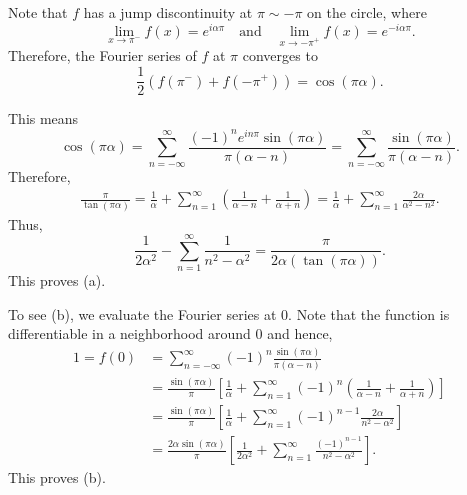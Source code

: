 \documentclass[12pt]{amsart}
\begin{document}
Note that $f$ has a jump discontinuity at $\pi\sim -\pi$ on the circle, where 
\begin{equation*}
	\lim_{x\to\pi^-}f(x) = e^{i\alpha\pi}\quad\text{and}\quad\lim_{x\to-\pi^+} f(x) = e^{-i\alpha\pi}.
\end{equation*}
Therefore, the Fourier series of $f$ at $\pi$ converges to 
\begin{equation*}
	\frac{1}{2}\left(f(\pi^-) + f(-\pi^+)\right) = \cos(\pi\alpha).
\end{equation*}

This means 
\begin{equation*}
	\cos(\pi\alpha) = \sum_{n = -\infty}^\infty\frac{(-1)^ne^{in\pi}\sin(\pi\alpha)}{\pi(\alpha - n)} = \sum_{n = -\infty}^\infty\frac{\sin(\pi\alpha)}{\pi(\alpha - n)}. 
\end{equation*}
Therefore, 
\begin{align*}
	\frac{\pi}{\tan(\pi\alpha)} = \frac{1}{\alpha} + \sum_{n = 1}^\infty\left(\frac{1}{\alpha - n} + \frac{1}{\alpha + n}\right) = \frac{1}{\alpha} + \sum_{n = 1}^\infty\frac{2\alpha}{\alpha^2 - n^2}.
\end{align*}
Thus, 
\begin{equation*}
	\frac{1}{2\alpha^2} - \sum_{n = 1}^\infty\frac{1}{n^2 - \alpha^2} = \frac{\pi}{2\alpha(\tan(\pi\alpha))}.
\end{equation*}
This proves (a).

To see (b), we evaluate the Fourier series at $0$. Note that the function is differentiable in a neighborhood around $0$ and hence, 
\begin{align*}
	1 = f(0) &= \sum_{n = -\infty}^\infty (-1)^n\frac{\sin(\pi\alpha)}{\pi(\alpha - n)}\\
	&= \frac{\sin(\pi\alpha)}{\pi}\left[\frac{1}{\alpha} + \sum_{n = 1}^\infty (-1)^n\left(\frac{1}{\alpha - n} + \frac{1}{\alpha + n}\right)\right]\\
	&= \frac{\sin(\pi\alpha)}{\pi}\left[\frac{1}{\alpha} + \sum_{n = 1}^\infty (-1)^{n - 1}\frac{2\alpha}{n^2 - \alpha^2}\right]\\
	&= \frac{2\alpha\sin(\pi\alpha)}{\pi}\left[\frac{1}{2\alpha^2} + \sum_{n = 1}^\infty\frac{(-1)^{n - 1}}{n^2 - \alpha^2}\right].
\end{align*}
This proves (b).
\end{document}
